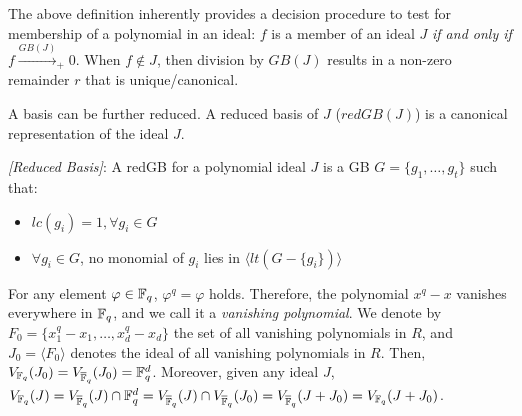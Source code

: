  The above definition inherently provides
a decision procedure to test for membership of a polynomial in an ideal:
$f$ is a member of an ideal $J$ {\it if and only if} 
$f\xrightarrow{GB(J)}_+0$.
When $f\notin J$,
then division by $GB(J)$ results in a non-zero remainder $r$ that is
unique/canonical. 

A \Grobner basis can be further reduced. A reduced \Grobner basis
of $J$ ($redGB(J)$) is a canonical representation of the ideal $J$.

\begin{Definition} \label{def:rgb}
{\it  [Reduced \Grobner Basis]}:
    A redGB for a polynomial ideal $J$ is 
    a GB $G=\{g_{1},\dots,g_{t}\}$ such that:
    \begin{itemize}
        \item $lc(g_{i})=1,\forall g_{i}\in G$
        \item $\forall g_{i} \in G$, no monomial of $g_{i}$ 
        lies in $\langle lt(G-\{g_{i}\})\rangle$
    \end{itemize}
\end{Definition}


For any element $\varphi\in{\mathbb{F}}_{q}$, $\varphi^q=\varphi$ holds. Therefore,
the polynomial $x^q-x$ vanishes everywhere in ${\mathbb{F}}_{q}$, and we call it a
{\it vanishing polynomial}. We denote by $F_0 =
\{x_1^q-x_1,\dots,x_d^q-x_d\}$ the set of all vanishing polynomials in
$R$, and  $J_0 = \langle F_0 \rangle$ denotes the ideal of all
vanishing polynomials in $R$. 
Then, $V_{{\mathbb{F}}_{q}}(J_0) =
V_{\overline{\mathbb{F}}_q}(J_0) = {\mathbb{F}}_{q}^d$. Moreover, given any ideal $J$, $V_{{\mathbb{F}}_{q}}(J) =
V_{\overline{\mathbb{F}}_q}(J) \cap{\mathbb{F}}_{q}^d = V_{\overline{\mathbb{F}}_q}(J) \cap V_{\overline{\mathbb{F}}_q}(J_0) =
V_{\overline{\mathbb{F}}_q}(J+J_0) = V_{{\mathbb{F}}_{q}}(J+J_0)$. 


